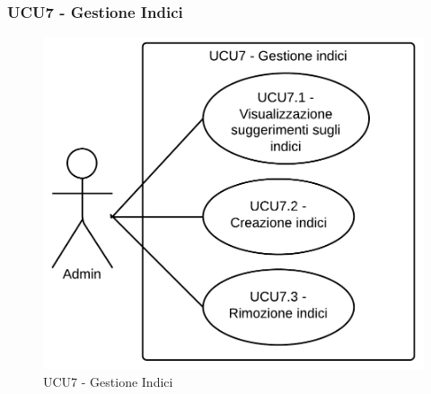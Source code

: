 \subsubsection{UCU7 - Gestione Indici} 
    \begin{center}
    \begin{figure}[H]
      \includegraphics[scale=0.16]{UML/UCU7 - Gestione Indici.png}
      \caption{UCU7 - Gestione Indici} 
    \end{figure}
    \end{center}
    
